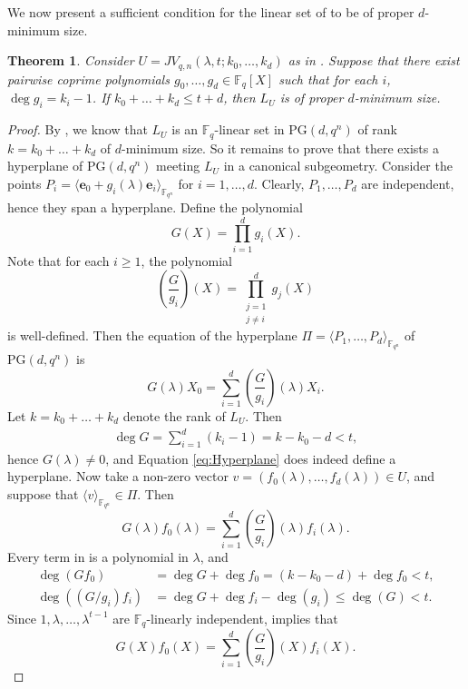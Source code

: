 \documentclass[11pt]{article}
\newtheorem{theorem}{Theorem}[section]
\theoremstyle{definition}
\newcommand{\fqn}{\mathbb{F}_{q^n}}
\newcommand{\F}{{\mathbb F}}
\newcommand{\fq}{{\mathbb F}_{q}}
\newcommand{\PG}{\mathrm{PG}}
\newcommand{\pg}{\PG}
\newcommand{\e}{\mathbf e}
\begin{document}
We now present a sufficient condition for the linear set of  to be of proper $d$-minimum size.

\begin{theorem} \label{prop:properminimumjena}
Consider $U = JV_{q,n}(\lambda,t;k_0,\dots,k_d)$ as in .
Suppose that there exist pairwise coprime polynomials $g_0, \dots, g_d \in \fq[X]$ such that for each $i$, $\deg g_i = k_i - 1$.
If $k_0 + \ldots + k_d \leq t+d$, then $L_U$ is of proper $d$-minimum size.
\end{theorem}

\begin{proof}
By , we know that $L_U$ is an $\fq$-linear set in $\PG(d,q^n)$ of rank $k=k_0+\ldots+k_{d}$ of $d$-minimum size.
So it remains to prove that there exists a hyperplane of $\PG(d,q^n)$ meeting $L_U$ in a canonical subgeometry.
Consider the points $P_i=\langle \e_0 + g_i(\lambda) \e_i \rangle_{\F_{q^n}}$ for $i=1,\dots,d$.
Clearly, $P_1, \dots, P_d$ are independent, hence they span a hyperplane.
Define the polynomial
\[
 G(X) = \prod_{i=1}^d g_i(X).
\]
Note that for each $i \geq 1$, the polynomial
\[
 \left( \frac G {g_i} \right)(X) = \prod_{\substack{j=1 \\ j \neq i}}^d g_j(X)
\]
is well-defined.
Then the equation of the hyperplane $\Pi = \langle P_1, \dots, P_d \rangle_{\fqn}$ of $\pg(d,q^n)$ is
\begin{equation}
 G(\lambda) X_0 = \sum_{i=1}^d \left( \frac G {g_i} \right) (\lambda) X_i.
 \label{eq:Hyperplane}
\end{equation}
Let $k = k_0 + \ldots + k_d$ denote the rank of $L_U$.
Then
\begin{align*}
 \deg G = \sum_{i=1}^d (k_i-1) = k - k_0 - d < t,
\end{align*}
hence $G(\lambda) \neq 0$, and Equation \eqref{eq:Hyperplane} does indeed define a hyperplane.
Now take a non-zero vector $v = (f_0(\lambda), \dots, f_d(\lambda)) \in U$, and suppose that $\langle v \rangle_{\fqn} \in \Pi$.
Then
\begin{equation}
 G(\lambda) f_0(\lambda) = \sum_{i=1}^d \left( \frac G {g_i} \right) (\lambda) f_i(\lambda).
 \label{eq:PointInHyperplane}
\end{equation}
Every term in  is a polynomial in $\lambda$, and
\begin{align*}
 \deg (G f_0) & = \deg G + \deg f_0 = (k-k_0-d) + \deg f_0 < t, \\
 \deg ((G/g_i) f_i) &= \deg G + \deg f_i - \deg(g_i) \leq \deg(G) < t.
\end{align*}
Since $1, \lambda, \dots, \lambda^{t-1}$ are $\fq$-linearly independent,  implies that
\begin{equation*}
 G(X) f_0(X) = \sum_{i=1}^d \left( \frac G {g_i} \right)(X) f_i (X).
\end{equation*}


\end{proof}
\end{document}
